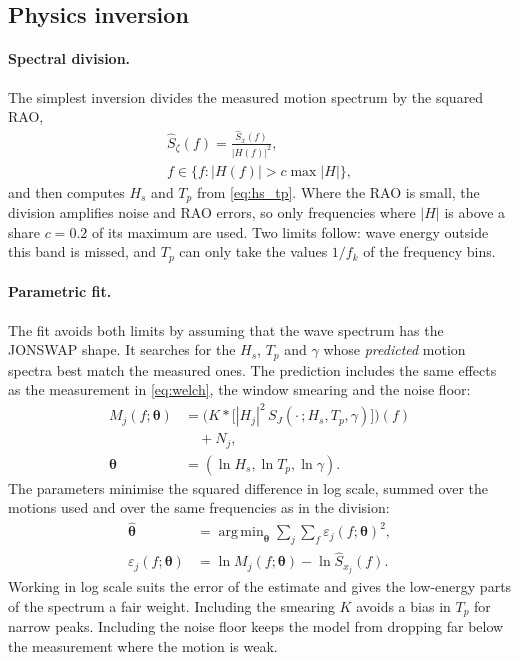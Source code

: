 \documentclass[10pt,a4paper,twocolumn,twoside]{article}
\newcommand{\Hs}{H_{s}}
\newcommand{\Tp}{T_{p}}
\newcommand{\vect}[1]{\boldsymbol{#1}}
\DeclareMathOperator*{\argmin}{arg\,min}
\begin{document}
\subsection{Physics inversion}
\label{sec:theory_inverse}

\paragraph{Spectral division.}
The simplest inversion divides the measured motion spectrum by the squared RAO,
\begin{equation}
\begin{gathered}
\hat S_\zeta(f) = \frac{\hat S_x(f)}{|H(f)|^2},
\\
f \in \{ f : |H(f)| > c \max |H| \},
\end{gathered}
\label{eq:division}
\end{equation}
and then computes $\Hs$ and $\Tp$ from \cref{eq:hs_tp}. Where the RAO is small, the division
amplifies noise and RAO errors, so only frequencies where $|H|$ is above a share $c = 0.2$ of its
maximum are used. Two limits follow: wave energy outside this band is missed, and $\Tp$ can only
take the values $1/f_k$ of the frequency bins.

\paragraph{Parametric fit.}
The fit avoids both limits by assuming that the wave spectrum has the JONSWAP shape. It searches
for the $\Hs$, $\Tp$ and $\gamma$ whose \emph{predicted} motion spectra best match the measured
ones. The prediction includes the same effects as the measurement in \cref{eq:welch}, the window
smearing and the noise floor:
\begin{equation}
\begin{split}
M_j(f; \vect\theta) &= \Big( K * \big[ |H_j|^2\, S_J(\cdot\,; \Hs, \Tp, \gamma) \big] \Big)(f) \\
&\quad + N_j, \\
\vect\theta &= (\ln\Hs, \ln\Tp, \ln\gamma).
\end{split}
\label{eq:model}
\end{equation}
The parameters minimise the squared difference in log scale, summed over the motions used and over
the same frequencies as in the division:
\begin{equation}
\begin{split}
\hat{\vect\theta} &= \argmin_{\vect\theta} \sum_j \sum_{f} \varepsilon_j(f; \vect\theta)^2, \\
\varepsilon_j(f; \vect\theta) &= \ln M_j(f; \vect\theta) - \ln \hat S_{x_j}(f).
\end{split}
\label{eq:fit}
\end{equation}
Working in log scale suits the error of the estimate and gives the low-energy parts of the spectrum
a fair weight. Including the smearing $K$ avoids a bias in $\Tp$ for narrow peaks. Including the
noise floor keeps the model from dropping far below the measurement where the motion is weak.
\end{document}

